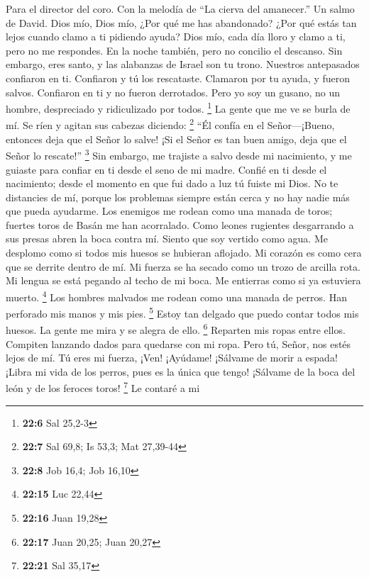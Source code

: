 Para el director del coro. Con la melodía de ``La cierva del amanecer.''
Un salmo de David.  Dios mío, Dios mío, ¿Por qué me has
abandonado? ¿Por qué estás tan lejos cuando clamo a ti pidiendo ayuda?
 Dios mío, cada día lloro y clamo a ti, pero no me
respondes. En la noche también, pero no concilio el descanso.
 Sin embargo, eres santo, y las alabanzas de Israel son tu
trono.  Nuestros antepasados confiaron en ti. Confiaron y tú
los rescataste.  Clamaron por tu ayuda, y fueron salvos.
Confiaron en ti y no fueron derrotados.  Pero yo soy un
gusano, no un hombre, despreciado y ridiculizado por todos. \footnote{\textbf{22:6}
  Sal 25,2-3}  La gente que me ve se burla de mí. Se ríen y
agitan sus cabezas diciendo: \footnote{\textbf{22:7} Sal 69,8; Is 53,3;
  Mat 27,39-44}  ``Él confía en el Señor---¡Bueno, entonces
deja que el Señor lo salve! ¡Si el Señor es tan buen amigo, deja que el
Señor lo rescate!'' \footnote{\textbf{22:8} Job 16,4; Job 16,10}
 Sin embargo, me trajiste a salvo desde mi nacimiento, y me
guiaste para confiar en ti desde el seno de mi madre. 
Confié en ti desde el nacimiento; desde el momento en que fui dado a luz
tú fuiste mi Dios.  No te distancies de mí, porque los
problemas siempre están cerca y no hay nadie más que pueda ayudarme.
 Los enemigos me rodean como una manada de toros; fuertes
toros de Basán me han acorralado.  Como leones rugientes
desgarrando a sus presas abren la boca contra mí.  Siento
que soy vertido como agua. Me desplomo como si todos mis huesos se
hubieran aflojado. Mi corazón es como cera que se derrite dentro de mí.
 Mi fuerza se ha secado como un trozo de arcilla rota. Mi
lengua se está pegando al techo de mi boca. Me entierras como si ya
estuviera muerto. \footnote{\textbf{22:15} Luc 22,44}  Los
hombres malvados me rodean como una manada de perros. Han perforado mis
manos y mis pies. \footnote{\textbf{22:16} Juan 19,28} 
Estoy tan delgado que puedo contar todos mis huesos. La gente me mira y
se alegra de ello. \footnote{\textbf{22:17} Juan 20,25; Juan 20,27}
 Reparten mis ropas entre ellos. Compiten lanzando dados
para quedarse con mi ropa.  Pero tú, Señor, nos estés lejos
de mí. Tú eres mi fuerza, ¡Ven! ¡Ayúdame!  ¡Sálvame de
morir a espada! ¡Libra mi vida de los perros, pues es la única que
tengo!  ¡Sálvame de la boca del león y de los feroces
toros! \footnote{\textbf{22:21} Sal 35,17}  Le contaré a mi
